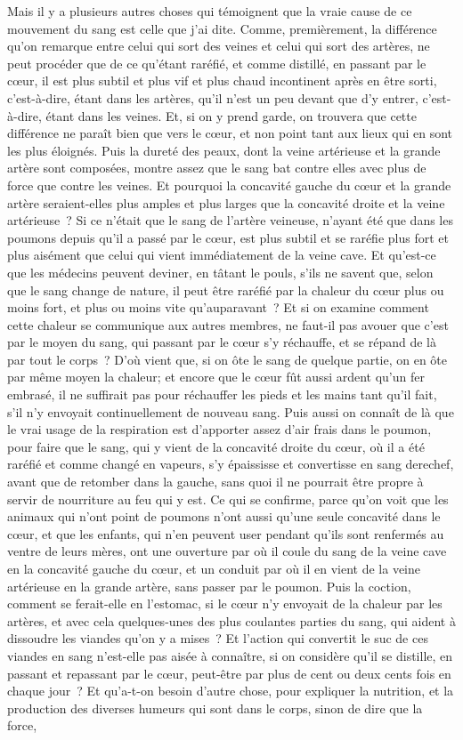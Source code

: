 \documentclass[french,twoside]{book} %
\begin{document}
Mais il y a plusieurs autres choses qui témoignent que la vraie cause de ce mouvement du sang est celle que j'ai dite. Comme, premièrement, la différence qu'on remarque entre celui qui sort des veines et celui qui sort des artères, ne peut procéder que de ce qu'étant raréfié, et comme distillé, en passant par le cœur, il est plus subtil et plus vif et plus chaud incontinent après en être sorti, c'est-à-dire, étant dans les artères, qu'il n'est un peu devant que d'y entrer, c'est-à-dire, étant dans les veines. Et, si on y prend garde, on trouvera que cette différence ne paraît bien que vers le cœur, et non point tant aux lieux qui en sont les plus éloignés. Puis la dureté des peaux, dont la veine artérieuse et la grande artère sont composées, montre assez que le sang bat contre elles avec plus de force que contre les veines. Et pourquoi la concavité gauche du cœur et la grande artère seraient-elles plus amples et plus larges que la concavité droite et la veine artérieuse ? Si ce n'était que le sang de l'artère veineuse, n'ayant été que dans les poumons depuis qu'il a passé par le cœur, est plus subtil et se raréfie plus fort et plus aisément que celui qui vient immédiatement de la veine cave. Et qu'est-ce que les médecins peuvent deviner, en tâtant le pouls, s'ils ne savent que, selon que le sang change de nature, il peut être raréfié par la chaleur du cœur plus ou moins fort, et plus ou moins vite qu'auparavant ? Et si on examine comment cette chaleur se communique aux autres membres, ne faut-il pas avouer que c'est par le moyen du sang, qui passant par le cœur s'y réchauffe, et se répand de là par tout le corps ? D'où vient que, si on ôte le sang de quelque partie, on en ôte par même moyen la chaleur; et encore que le cœur fût aussi ardent qu'un fer embrasé, il ne suffirait pas pour réchauffer les pieds et les mains tant qu'il fait, s'il n'y envoyait continuellement de nouveau sang. Puis aussi on connaît de là que le vrai usage de la respiration est d'apporter assez d'air frais dans le poumon, pour faire que le sang, qui y vient de la concavité droite du cœur, où il a été raréfié et comme changé en vapeurs, s'y épaississe et convertisse en sang derechef, avant que de retomber dans la gauche, sans quoi il ne pourrait être propre à servir de nourriture au feu qui y est. Ce qui se confirme, parce qu'on voit que les animaux qui n'ont point de poumons n'ont aussi qu'une seule concavité dans le cœur, et que les enfants, qui n'en peuvent user pendant qu'ils sont renfermés au ventre de leurs mères, ont une ouverture par où il coule du sang de la veine cave en la concavité gauche du cœur, et un conduit par où il en vient de la veine artérieuse en la grande artère, sans passer par le poumon. Puis la coction, comment se ferait-elle en l'estomac, si le cœur n'y envoyait de la chaleur par les artères, et avec cela quelques-unes des plus coulantes parties du sang, qui aident à dissoudre les viandes qu'on y a mises ? Et l'action qui convertit le suc de ces viandes en sang n'est-elle pas aisée à connaître, si on considère qu'il se distille, en passant et repassant par le cœur, peut-être par plus de cent ou deux cents fois en chaque jour ? Et qu'a-t-on besoin d'autre chose, pour expliquer la nutrition, et la production des diverses humeurs qui sont dans le corps, sinon de dire que la force, 
\end{document}

